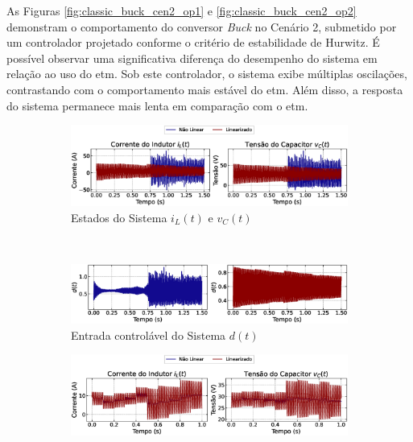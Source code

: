 As Figuras \ref{fig:classic_buck_cen2_op1} e \ref{fig:classic_buck_cen2_op2} demonstram o comportamento do conversor \textit{Buck} no Cenário 2, submetido por um controlador projetado conforme o critério de estabilidade de Hurwitz. É possível observar uma significativa diferença do desempenho do sistema em relação ao uso do \acrshort{etm}. Sob este controlador, o sistema exibe múltiplas oscilações, contrastando com o comportamento mais estável do \acrshort{etm}. Além disso, a resposta do sistema permanece mais lenta em comparação com o \acrshort{etm}.

\begin{figure}[H]
  \centering
  \captionsetup{justification=centering}
  \begin{subfigure}{1.\textwidth}
    \centering
    \includegraphics[width=1.\textwidth]{figuras/classic/buck/sim2/op1/result.eps}
    \caption{Estados do Sistema $i_L(t)$  e $v_C(t)$}
  \end{subfigure}
  \\[6pt]
  \begin{subfigure}{1.\textwidth}
    \centering
    \includegraphics[width=1.\textwidth]{figuras/classic/buck/sim2/op1/duty-cycle.eps}
    \caption{Entrada controlável do Sistema $d(t)$}
  \end{subfigure}
  \caption{Conversor \textit{Buck} no Cenário 2 operando em torno de $P_{\mathrm{o}, 1}$ sob controlador projetado utilizando o critério de estabilidade de Hurwitz.}
  \label{fig:classic_buck_cen2_op1}
  \begin{subfigure}{1.\textwidth}
    \centering
    \includegraphics[width=1.\textwidth]{figuras/classic/buck/sim2/op2/result.eps}

\end{subfigure}
\end{figure}
